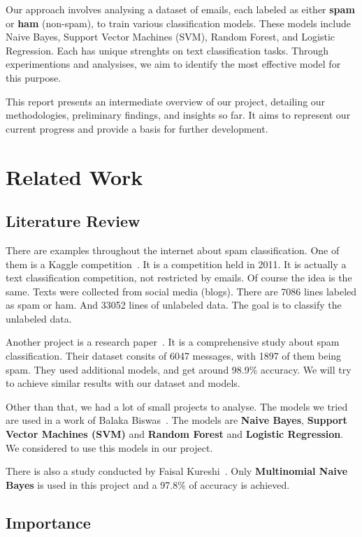 \documentclass[conference]{IEEEtran}
\begin{document}
Our approach involves analysing a dataset of emails, each labeled as either \textbf{spam} or \textbf{ham} (non-spam), to train various classification models. These models include Naive Bayes, Support Vector Machines (SVM), Random Forest, and Logistic Regression. Each has unique strenghts on text classification tasks. Through experimentions and analysises, we aim to identify the most effective model for this purpose.

This report presents an intermediate overview of our project, detailing our methodologies, preliminary findings, and insights so far. It aims to represent our current progress and provide a basis for further development.

\section{Related Work}

\subsection{Literature Review}

There are examples throughout the internet about spam classification. One of them is a Kaggle competition \cite{kaggle_competition}. It is a competition held in 2011. It is actually a text classification competition, not restricted by emails. Of course the idea is the same. Texts were collected from social media (blogs). There are 7086 lines labeled as spam or ham. And 33052 lines of unlabeled data. The goal is to classify the unlabeled data.

Another project is a research paper \cite{researchgate}. It is a comprehensive study about spam classification. Their dataset consits of 6047 messages, with 1897 of them being spam. They used additional models, and get around 98.9\% accuracy. We will try to achieve similar results with our dataset and models.

Other than that, we had a lot of small projects to analyse. The models we tried are used in a work of Balaka Biswas \cite{balaka_biswas}. The models are \textbf{Naive Bayes}, \textbf{Support Vector Machines (SVM)} and \textbf{Random Forest} and \textbf{Logistic Regression}. We considered to use this models in our project.

There is also a study conducted by Faisal Kureshi \cite{faisal_kureshi}. Only \textbf{Multinomial Naive Bayes} is used in this project and a 97.8\% of accuracy is achieved.

\subsection{Importance}
\end{document}
